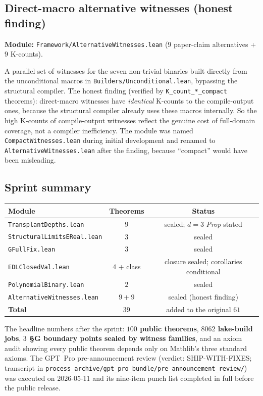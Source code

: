 \documentclass[11pt]{article}
\theoremstyle{plain}
\theoremstyle{definition}
\begin{document}
\subsection*{Direct-macro alternative witnesses (honest finding)}

\noindent\textbf{Module:} \texttt{Framework/AlternativeWitnesses.lean}
($9$ paper-claim alternatives + $9$ K-counts).

A parallel set of witnesses for the seven non-trivial binaries
built directly from the unconditional macros in
\texttt{Builders/Unconditional.lean}, bypassing the structural
compiler. The honest finding (verified by
\texttt{K\_count\_*\_compact} theorems): direct-macro witnesses have
\emph{identical} K-counts to the compile-output ones, because the
structural compiler already uses these macros internally. So the
high K-counts of compile-output witnesses reflect the genuine cost
of full-domain coverage, not a compiler inefficiency. The module was
named \texttt{CompactWitnesses.lean} during initial development and
renamed to \texttt{AlternativeWitnesses.lean} after the finding,
because ``compact'' would have been misleading.

\subsection*{Sprint summary}

\begin{center}
\begin{tabular}{l c c}
\toprule
\textbf{Module} & \textbf{Theorems} & \textbf{Status} \\
\midrule
\texttt{TransplantDepths.lean}        & $9$            & sealed; $d=3$ \emph{Prop} stated \\
\texttt{StructuralLimitsEReal.lean}   & $3$            & sealed \\
\texttt{GFullFix.lean}                & $3$            & sealed \\
\texttt{EDLClosedVal.lean}            & $4$ + class    & closure sealed; corollaries conditional \\
\texttt{PolynomialBinary.lean}        & $2$            & sealed \\
\texttt{AlternativeWitnesses.lean}    & $9 + 9$        & sealed (honest finding) \\
\midrule
\textbf{Total}                        & \textbf{$39$}  & added to the original $61$ \\
\bottomrule
\end{tabular}
\end{center}

The headline numbers after the sprint: \textbf{$100$ public theorems},
\textbf{$8062$ lake-build jobs}, \textbf{$3$ §G boundary points sealed
by witness families}, and an axiom audit showing every public theorem
depends only on Mathlib's three standard axioms. The GPT~Pro
pre-announcement review (verdict: SHIP-WITH-FIXES; transcript in
\texttt{process\_archive/gpt\_pro\_bundle/pre\_announcement\_review/})
was executed on 2026-05-11 and its nine-item punch list completed in
full before the public release.
\end{document}
